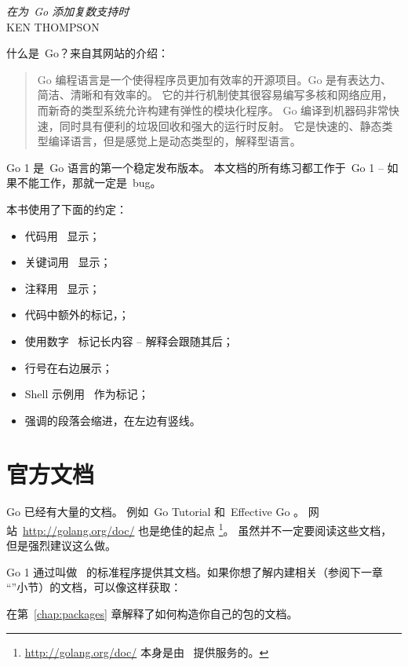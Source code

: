 {\textit{在为~Go 添加复数支持时}\\ \textsc{KEN THOMPSON}}

\noindent{}什么是~Go？来自其网站\cite{go_web}的介绍：
\begin{quote}
Go 编程语言是一个使得程序员更加有效率的开源项目。Go 是有表达力、简洁、清晰和有效率的。
它的并行机制使其很容易编写多核和网络应用，而新奇的类型系统允许构建有弹性的模块化程序。
Go 编译到机器码非常快速，同时具有便利的垃圾回收和强大的运行时反射。
它是快速的、静态类型编译语言，但是感觉上是动态类型的，解释型语言。
\end{quote}

Go 1 是~Go 语言的第一个稳定发布版本。
本文档的所有练习都工作于~Go 1 -- 如果不能工作，那就一定是~bug。

本书使用了下面的约定：
\begin{itemize}
\item 代码用~ 显示；
\item 关键词用~ 显示；
\item 注释用~ 显示；
\item 代码中额外的标记，；
\item 使用数字~ 标记长内容 -- 解释会跟随其后；
\item 行号在右边展示；
\item Shell 示例用~\pr{} 作为标记；
\item 强调的段落会缩进，在左边有竖线。
\end{itemize}

\section{官方文档}
Go 已经有大量的文档。
例如~Go Tutorial \cite{go_tutorial} 和~Effective Go \cite{effective_go}。
网站~\url{http://golang.org/doc/} 也是绝佳的起点 
\footnote{\url{http://golang.org/doc/} 本身是由~ 提供服务的。}。
虽然并不一定要阅读这些文档，但是强烈建议这么做。

Go 1 通过叫做~
的标准程序提供其文档。如果你想了解内建相关（参阅下一章
``''小节）的文档，可以像这样获取：
\begin{display}
\pr {}
\end{display}

在第~\ref{chap:packages} 章解释了如何构造你自己的包的文档。

